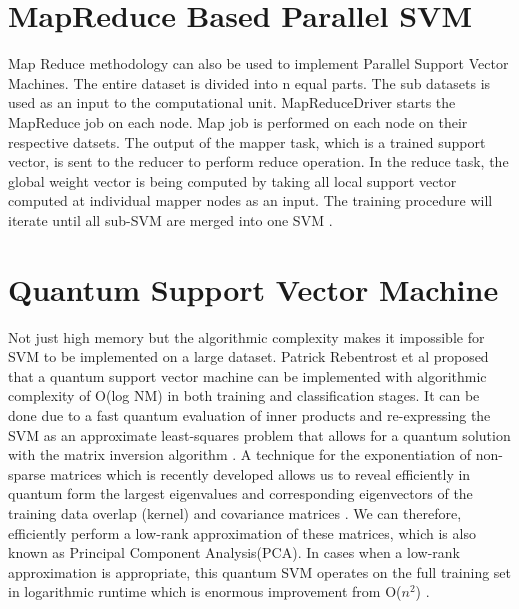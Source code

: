 \documentclass[sigconf]{acmart}
\begin{document}
\section{MapReduce Based Parallel SVM}
Map Reduce methodology can also be used to implement Parallel Support Vector Machines. The entire dataset is divided into n equal parts. The sub datasets is used as an input to the computational unit. MapReduceDriver starts the MapReduce job on each node. Map job is performed on each node on their respective datsets. The output of the mapper task, which is a trained support vector, is sent to the reducer to perform reduce operation. In the reduce task, the global weight vector is being computed by taking all local support vector computed at individual mapper nodes as an input. The training procedure will iterate until all sub-SVM are merged into one SVM \cite{Psvm}.

\section{Quantum Support Vector Machine}
Not just high memory but the algorithmic complexity makes it impossible for SVM to be implemented on a large dataset. Patrick Rebentrost et al proposed that a quantum support vector machine can be implemented with algorithmic complexity of O(log NM) in both training and classification stages. It can be done due to a fast quantum evaluation of inner products and re-expressing the SVM as an approximate least-squares problem that allows for a quantum solution with the matrix inversion algorithm \cite{Quantum}. A technique for the exponentiation of non-sparse matrices which is recently developed allows us to reveal efficiently in quantum form the largest eigenvalues and corresponding eigenvectors of the training data overlap (kernel) and covariance matrices \cite{Quantum}. We can therefore, efficiently perform a low-rank approximation of these matrices, which is also known as Principal Component Analysis(PCA). In cases when a low-rank approximation is appropriate, this quantum SVM operates on the full training set in logarithmic runtime which is enormous improvement from O($n^2$) \cite{Quantum}.
\end{document}
